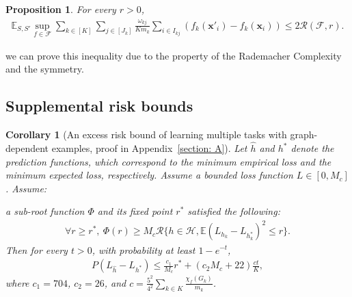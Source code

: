 \documentclass{article}
\def\vx{{\mathbf{x}}}
\def\eE{\mathbb{E}}
\newtheorem{proposition}{Proposition}
\newtheorem{corollary}{Corollary}
\begin{document}
\begin{proposition} \label{pro: equ Rademacher}
For every $ r > 0 $, 
\begin{align}
    \eE _{S,S'}  \sup _{f \in \mathcal{F}} \sum _{k \in [K]} \sum _{j \in [J_k]}  \frac{\omega_{kj}}{K m_k}  \sum _{i \in I_{kj}} ( f_k(\vx'_i) - f_k(\vx_i)) \leq 2 \mathcal{R} (\mathcal{F},r) .
\end{align}

\end{proposition}
we can prove this inequality due to the property of the Rademacher Complexity and the symmetry.  
\subsection{Supplemental risk bounds}
\label{sec-app:supplemental-risk-bounds}
\begin{corollary}[An excess risk bound of learning multiple tasks with graph-dependent examples, proof in Appendix~\ref{section: A}] \label{thm: general loss bound}
    Let \( \hat{h} \) and \( h^* \) denote the prediction functions, which correspond to the minimum empirical loss and the minimum expected loss, respectively.
    Assume a bounded loss function $ L \in [0, M_c] $. Assume:

    a sub-root function $\Phi$ and its fixed point $r^*$ satisfied the following: 
    \begin{align*}
        \forall r \geq r^*,~  \Phi (r) \geq M_c \mathcal{R} \{ h \in \mathcal{H}, \eE (L_{h_k} - L_{h_k^*})^2 \leq r \}.
    \end{align*}
    Then for every $t > 0$, with probability at least $1 - e^{-t}$, 
    \begin{align} \label{eq: collary 5.1 bounded loss}
        P (L_ {\hat{h}} - L_{h^*}) \leq \frac{c_1 }{M_c} r^* + (c_2 M_c  + 22) \frac{ct}{K},  
    \end{align}
    where $c_1 = 704$, $c_2 = 26$, and $c = \frac{5^2}{4^2} \sum_{k \in K}\frac{\chi_f(G_k)}{m_k} $. 
\end{corollary}
\end{document}
